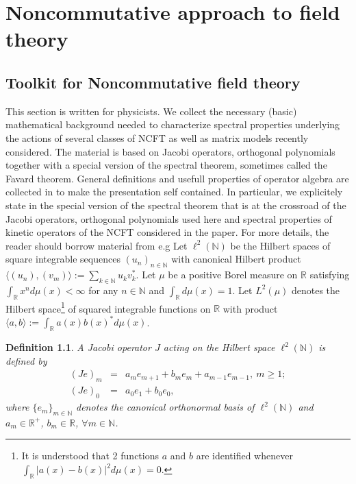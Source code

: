 \documentclass[10pt]{book}
\let\int\int
\theoremstyle{break}
\newtheorem{definition}{Definition}
\begin{document}
\part{Noncommutative approach to field theory}


\chapter{Toolkit for Noncommutative field theory}


This section is written for physicists. We collect the necessary (basic) mathematical background needed to characterize spectral properties underlying the actions of several classes of NCFT as well as matrix models recently considered. The material is based on Jacobi operators, orthogonal polynomials together with a special version of the spectral theorem, sometimes called the Favard theorem. General definitions and usefull properties of operator algebra are collected in %
to make the presentation self contained. In particular, we explicitely state in %
the special version of the spectral theorem that is at the crossroad of the Jacobi operators, orthogonal polynomials used here and spectral properties of kinetic operators of the NCFT considered in the paper. For more details, the reader should borrow material from e.g %
Let $\ell^2(\mathbb{N})$ be the Hilbert spaces of square integrable sequences $(u_n)_{n\in\mathbb{N}}$ with canonical Hilbert product $\langle (u_n),(v_m)\rangle:=\sum_{k\in\mathbb{N}}u_kv_k^*$. Let $\mu$ be a positive Borel measure on $\mathbb{R}$ satisfying $\int_\mathbb{R} x^nd\mu(x)<\infty$ for any $n\in\mathbb{N}$ and $\int_\mathbb{R} d\mu(x)=1$. Let $L^2(\mu)$ denotes the Hilbert space{\footnote{It is understood that 2 functions $a$ and $b$ are identified whenever $\int_\mathbb{R}\vert a(x)-b(x) \vert^2d\mu(x)=0$.}} of squared integrable functions on $\mathbb{R}$ with product $\langle a,b\rangle:=\int_\mathbb{R}a(x)b(x)^*d\mu(x)$. 
\begin{definition}
A Jacobi operator $J$ acting on the Hilbert space $\ell^2(\mathbb{N})$ is defined by
\begin{eqnarray*}
(Je)_m&=&a_me_{m+1}+b_me_m+a_{m-1}e_{m-1},\ m\ge1;\nonumber\\ 
(Je)_0&=&a_0e_1+b_0e_0,
\end{eqnarray*}
where $\{e_m\}_{m\in\mathbb{N}}$ denotes the canonical orthonormal basis of $\ell^2(\mathbb{N})$ and $a_m\in\mathbb{R}^+$, $b_m\in\mathbb{R}$, $\forall m\in\mathbb{N}$.
\end{definition}
\end{document}
